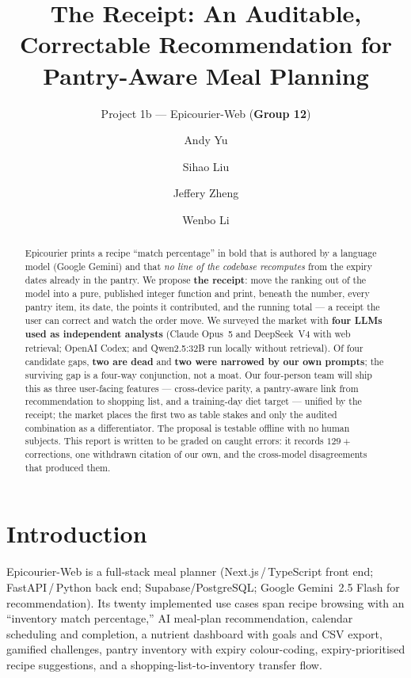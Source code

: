 \documentclass[sigconf,nonacm]{acmart}
\begin{document}
\title{The Receipt: An Auditable, Correctable Recommendation for Pantry-Aware Meal Planning}
\subtitle{Project 1b --- Epicourier-Web \quad(\textbf{Group 12})}

\author{Andy Yu}
\author{Sihao Liu}
\author{Jeffery Zheng}
\author{Wenbo Li}

\begin{abstract}
Epicourier prints a recipe ``match percentage'' in bold that is authored by a
language model (Google Gemini) and that \emph{no line of the codebase recomputes}
from the expiry dates already in the pantry. We propose \textbf{the receipt}: move
the ranking out of the model into a pure, published integer function and print,
beneath the number, every pantry item, its date, the points it contributed, and
the running total --- a receipt the user can correct and watch the order move. We
surveyed the market with \textbf{four LLMs used as independent analysts} (Claude
Opus~5 and DeepSeek~V4 with web retrieval; OpenAI Codex; and Qwen2.5:32B run
locally without retrieval). Of four candidate gaps, \textbf{two are dead} and
\textbf{two were narrowed by our own prompts}; the surviving gap is a four-way
conjunction, not a moat. Our four-person team will ship this as three user-facing
features --- cross-device parity, a pantry-aware link from recommendation to
shopping list, and a training-day diet target --- unified by the receipt; the
market places the first two as table stakes and only the audited combination as a
differentiator. The proposal is testable offline with no human subjects.
This report is written to be graded on caught errors: it records $129{+}$
corrections, one withdrawn citation of our own, and the cross-model disagreements
that produced them.
\end{abstract}

\maketitle

\section{Introduction}
Epicourier-Web is a full-stack meal planner (Next.js\,/\,TypeScript front end;
FastAPI\,/\,Python back end; Supabase/PostgreSQL; Google Gemini~2.5 Flash for
recommendation). Its twenty implemented use cases span recipe browsing with an
``inventory match percentage,'' AI meal-plan recommendation, calendar scheduling
and completion, a nutrient dashboard with goals and CSV export, gamified
challenges, pantry inventory with expiry colour-coding, expiry-prioritised recipe
suggestions, and a shopping-list-to-inventory transfer flow.
\end{document}
